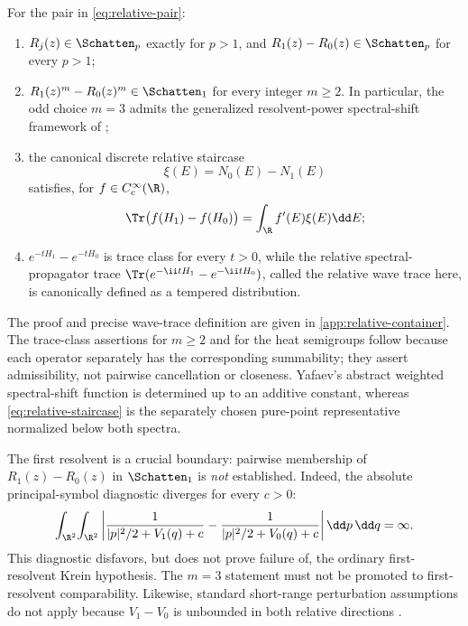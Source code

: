 \begin{proposition}
\label{prop:relative-container}
For the pair in \cref{eq:relative-pair}:
\begin{enumerate}[label=\textup{(\roman*)}]
 \item \(R_j(z)\in\Schatten_p\) exactly for \(p>1\), and
 \(R_1(z)-R_0(z)\in\Schatten_p\) for every \(p>1\);
 \item \(R_1(z)^m-R_0(z)^m\in\Schatten_1\) for every integer \(m\geq2\).
 In particular, the odd choice \(m=3\) admits the generalized
 resolvent-power spectral-shift framework of \citet{Yafaev2005};
 \item the canonical discrete relative staircase
 \begin{equation}
  \xi(E)=N_0(E)-N_1(E)
  \label{eq:relative-staircase}
 \end{equation}
 satisfies, for \(f\in C_c^\infty(\R)\),
 \begin{equation}
  \Tr\bigl(f(H_1)-f(H_0)\bigr)
  =\int_\R f'(E)\xi(E)\dd E;
  \label{eq:relative-trace-compact}
 \end{equation}
 \item \(e^{-tH_1}-e^{-tH_0}\) is trace class for every \(t>0\), while
 the relative spectral-propagator trace
 \(\Tr(e^{-\ii tH_1}-e^{-\ii tH_0})\), called the relative wave trace here,
 is canonically defined as a tempered distribution.
\end{enumerate}
\end{proposition}

The proof and precise wave-trace definition are given in
\cref{app:relative-container}.  The trace-class assertions for \(m\geq2\)
and for the heat semigroups follow because each operator separately has the
corresponding summability; they assert admissibility, not pairwise
cancellation or closeness.  Yafaev's abstract weighted spectral-shift
function is determined up to an additive constant, whereas
\cref{eq:relative-staircase} is the separately chosen pure-point
representative normalized below both spectra.

The first resolvent is a crucial boundary: pairwise membership of
\(R_1(z)-R_0(z)\) in \(\Schatten_1\) is \emph{not} established.  Indeed, the
absolute principal-symbol diagnostic diverges for every \(c>0\):
\begin{equation}
 \int_{\R^2}\!\int_{\R^2}
 \left|
 \frac{1}{|p|^2/2+V_1(q)+c}
 -\frac{1}{|p|^2/2+V_0(q)+c}
 \right|\dd p\,\dd q=\infty.
 \label{eq:first-resolvent-obstruction}
\end{equation}
This diagnostic disfavors, but does not prove failure of, the ordinary
first-resolvent Krein hypothesis.  The \(m=3\) statement must not be
promoted to first-resolvent comparability.  Likewise, standard short-range
perturbation assumptions do not apply because \(V_1-V_0\) is unbounded in
both relative directions \citep{FrankPushnitski2019}.

